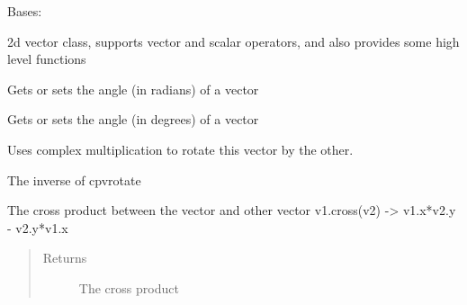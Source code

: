 \documentclass[letterpaper,10pt,english]{sphinxmanual}
\begin{document}
\begin{fulllineitems}
\label{geometry:serge.simplevecs.Vec2d}
Bases: 

2d vector class, supports vector and scalar operators,
and also provides some high level functions

\begin{fulllineitems}
\label{geometry:serge.simplevecs.Vec2d.angle}
Gets or sets the angle (in radians) of a vector

\end{fulllineitems}


\begin{fulllineitems}
\label{geometry:serge.simplevecs.Vec2d.angle_degrees}
Gets or sets the angle (in degrees) of a vector

\end{fulllineitems}


\begin{fulllineitems}
\label{geometry:serge.simplevecs.Vec2d.cpvrotate}
Uses complex multiplication to rotate this vector by the other.

\end{fulllineitems}


\begin{fulllineitems}
\label{geometry:serge.simplevecs.Vec2d.cpvunrotate}
The inverse of cpvrotate

\end{fulllineitems}


\begin{fulllineitems}
\label{geometry:serge.simplevecs.Vec2d.cross}
The cross product between the vector and other vector
v1.cross(v2) -\textgreater{} v1.x*v2.y - v2.y*v1.x
\begin{quote}\begin{description}
\item[{Returns}] \leavevmode
The cross product


\end{description}
\end{quote}
\end{fulllineitems}
\end{fulllineitems}
\end{document}
